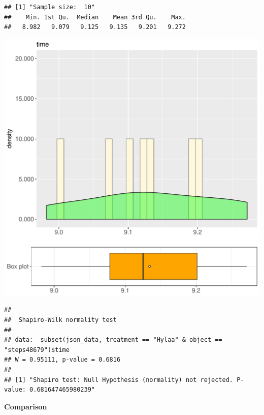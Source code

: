\documentclass{article}\usepackage[]{graphicx}\usepackage[]{color}
\makeatletter
\def\maxwidth{ %
  \ifdim\Gin@nat@width>\linewidth
    \linewidth
  \else
    \Gin@nat@width
  \fi
}
\newenvironment{kframe}{%
 \def\at@end@of@kframe{}%
 \ifinner\ifhmode%
  \def\at@end@of@kframe{\end{minipage}}%
  \begin{minipage}{\columnwidth}%
 \fi\fi%
 \def\FrameCommand##1{\hskip\@totalleftmargin \hskip-\fboxsep
 \colorbox{shadecolor}{##1}\hskip-\fboxsep
     \hskip-\linewidth \hskip-\@totalleftmargin \hskip\columnwidth}%
 \MakeFramed {\advance\hsize-\width
   \@totalleftmargin\z@ \linewidth\hsize
   \@setminipage}}%
 {\par\unskip\endMakeFramed%
 \at@end@of@kframe}
\newenvironment{knitrout}{}{} %
\makeatother
\begin{document}
\begin{knitrout}
\color{fgcolor}\begin{kframe}
\begin{verbatim}
## [1] "Sample size:  10"
##    Min. 1st Qu.  Median    Mean 3rd Qu.    Max. 
##   8.982   9.079   9.125   9.135   9.201   9.272
\end{verbatim}
\end{kframe}
\includegraphics[width=\maxwidth]{figure/RH2_Hylaa_steps48679-1} 
\begin{kframe}\begin{verbatim}
## 
## 	Shapiro-Wilk normality test
## 
## data:  subset(json_data, treatment == "Hylaa" & object == "steps48679")$time
## W = 0.95111, p-value = 0.6816
## 
## [1] "Shapiro test: Null Hypothesis (normality) not rejected. P-value: 0.681647465980239"
\end{verbatim}
\end{kframe}
\end{knitrout}
  
 \textbf{Comparison}
  
\end{document}
